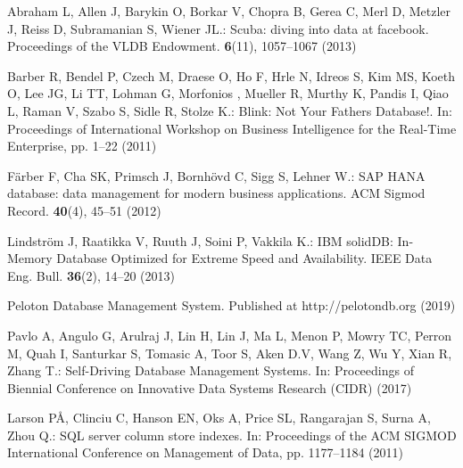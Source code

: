 
Abraham L, Allen J, Barykin O, Borkar V, Chopra B, Gerea C, Merl D, Metzler J, Reiss D, Subramanian S, Wiener JL.: Scuba: diving into data at facebook. Proceedings of the VLDB Endowment. \textbf{6}(11), 1057--1067 (2013)


Barber R, Bendel P, Czech M, Draese O, Ho F, Hrle N, Idreos S, Kim MS, Koeth O, Lee JG, Li TT, Lohman G, Morfonios , Mueller R, Murthy K, Pandis I, Qiao L, Raman V, Szabo S, Sidle R, Stolze K.: Blink: Not Your Father\textquotesingle s Database!. In: Proceedings of International Workshop on Business Intelligence for the Real-Time Enterprise, pp. 1--22 (2011)


F\"{a}rber F, Cha SK, Primsch J, Bornh\"{o}vd C, Sigg S, Lehner W.: SAP HANA database: data management for modern business applications. ACM Sigmod Record.  \textbf{40}(4), 45--51 (2012)

Lindstr\"{o}m J, Raatikka V, Ruuth J, Soini P, Vakkila K.: IBM solidDB: In-Memory Database Optimized for Extreme Speed and Availability. IEEE Data Eng. Bull. \textbf{36}(2), 14--20 (2013)

Peloton Database Management System. Published at http://pelotondb.org (2019)

Pavlo A, Angulo G, Arulraj J, Lin H, Lin J, Ma L, Menon P, Mowry TC, Perron M, Quah I, Santurkar S, Tomasic A, Toor S, Aken D.V, Wang Z, Wu Y, Xian R, Zhang T.: Self-Driving Database Management Systems. In: Proceedings of Biennial Conference on Innovative Data Systems Research (CIDR) (2017)

Larson P\r{A}, Clinciu C, Hanson EN, Oks A, Price SL, Rangarajan S, Surna A, Zhou Q.: SQL server column store indexes. In: Proceedings of the ACM SIGMOD International Conference on Management of Data, pp. 1177--1184 (2011)


